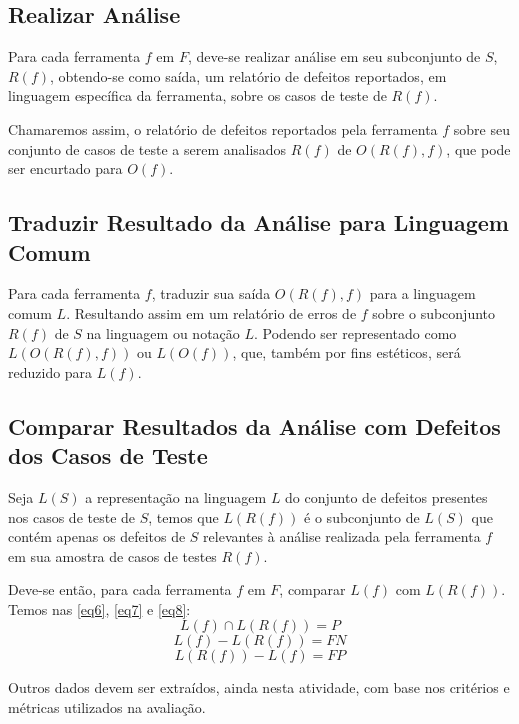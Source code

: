 \subsection{Realizar Análise}

Para cada ferramenta $f$ em $F$, deve-se realizar análise em seu subconjunto de $S$, $R(f)$, obtendo-se como saída, um relatório de defeitos reportados, em linguagem específica da ferramenta, sobre os casos de teste de $R(f)$.

Chamaremos assim, o relatório de defeitos reportados pela ferramenta $f$ sobre seu conjunto de casos de teste a serem analisados $R(f)$ de $O(R(f), f)$, que pode ser encurtado para $O(f)$.

\subsection{Traduzir Resultado da Análise para Linguagem Comum}

Para cada ferramenta $f$, traduzir sua saída $O(R(f), f)$ para a linguagem comum $L$. Resultando assim em um relatório de erros de $f$ sobre o subconjunto $R(f)$ de $S$ na linguagem ou notação $L$. Podendo ser representado como $L(O(R(f), f))$ ou $L(O(f))$, que, também por fins estéticos, será reduzido para $L(f)$.

\subsection{Comparar Resultados da Análise com Defeitos dos Casos de  Teste}

Seja $L(S)$ a representação na linguagem $L$ do conjunto de defeitos presentes nos casos de teste de $S$, temos que $L(R(f))$ é o subconjunto de $L(S)$ que contém apenas os defeitos de $S$ relevantes à análise realizada pela ferramenta $f$ em sua amostra de casos de testes $R(f)$.

Deve-se então, para cada ferramenta $f$ em $F$, comparar $L(f)$ com $L(R(f))$. Temos nas \eqref{eq6}, \eqref{eq7} e \eqref{eq8}:
\begin{equation}\label{eq6}
  L(f) \cap L(R(f)) = P
\end{equation}
\begin{equation}\label{eq7}
  L(f) - L(R(f)) = FN
\end{equation}
\begin{equation}\label{eq8}
  L(R(f)) - L(f) = FP
\end{equation}

Outros dados devem ser extraídos, ainda nesta atividade, com base nos critérios e métricas utilizados na avaliação.

